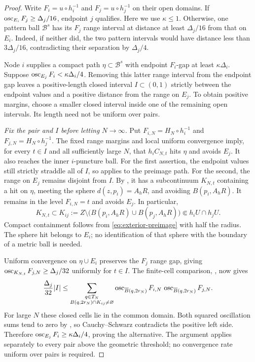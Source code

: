 \begin{proof}
Write $F_i=u\circ h_i^{-1}$ and $F_j=u\circ h_j^{-1}$ on their open
domains. If $\operatorname{osc}_{E_i}F_j\ge\Delta_j/16$, endpoint $j$ qualifies.
Here we use $\kappa\le1$.
Otherwise, one pattern ball $\mathcal B^s$ has its $F_j$ range interval
at distance at least $\Delta_j/16$ from that on $E_i$. Indeed, if
neither did, the two pattern intervals would have distance less than
$3\Delta_j/16$, contradicting their separation by $\Delta_j/4$.

Node $i$ supplies a compact path $\eta\subset\mathcal B^s$ with
endpoint $F_i$-gap at least $\kappa\Delta_i$. Suppose
$\operatorname{osc}_{E_j}F_i<\kappa\Delta_i/4$. Removing this latter range interval
from the endpoint gap leaves a positive-length closed interval
$I\subset(0,1)$ strictly between the endpoint values and a positive
distance from the range on $E_j$.
To obtain positive margins, choose a smaller closed interval inside
one of the remaining open intervals. Its length need not be uniform
over pairs.

\emph{Fix the pair and $I$ before letting $N\to\infty$.}
Put $F_{i,N}=H_N\circ h_i^{-1}$ and $F_{j,N}=H_N\circ h_j^{-1}$.
The fixed range margins and local uniform convergence imply, for
every $t\in I$ and all sufficiently large $N$, that $h_iC_{N,t}$ hits
$\eta$ and avoids $E_j$. It also reaches the inner $i$-puncture ball.
For the first assertion, the endpoint values still strictly straddle
all of $I$, so  applies to the preimage path.
For the second, the range on $E_j$ remains disjoint from $I$.
By , it has a subcontinuum $K_{N,t}$ containing
a hit on $\eta$, meeting the sphere $d(z,p_i)=A_hR$, and avoiding
$B(p_i,A_hR)$. It remains in the level $F_{i,N}=t$ and avoids $E_j$.
In particular,
\[
 K_{N,t}\subset K_{ij}:=
 Z\setminus\bigl(B(p_i,A_hR)\cup B(p_j,A_hR)\bigr)
 \Subset h_iU\cap h_jU.
\]
Compact containment follows from \eqref{eq:exterior-preimage} with
half the radius. The sphere hit belongs to $E_i$; no identification
of that sphere with the boundary of a metric ball is needed.

Uniform convergence on $\eta\cup E_i$ preserves the $F_j$ range gap,
giving $\operatorname{osc}_{K_{N,t}}F_{j,N}\ge\Delta_j/32$ uniformly for $t\in I$.
The finite-cell comparison, , now gives
\[
 \frac{\Delta_j}{32}|I|\le
 \sum_{\substack{q\in T_N\\B(q,2r_N)\cap K_{ij}\ne\varnothing}}
 \operatorname{osc}_{\overline B(q,2r_N)}F_{i,N}\,
 \operatorname{osc}_{\overline B(q,2r_N)}F_{j,N}.
\]
For large $N$ these closed cells lie in the common domain. Both squared
oscillation sums tend to zero by , so
Cauchy--Schwarz contradicts the positive left side. Therefore
$\operatorname{osc}_{E_j}F_i\ge\kappa\Delta_i/4$, proving the alternative.
The argument applies separately to every pair above the geometric
threshold; no convergence rate uniform over pairs is required.
\end{proof}

